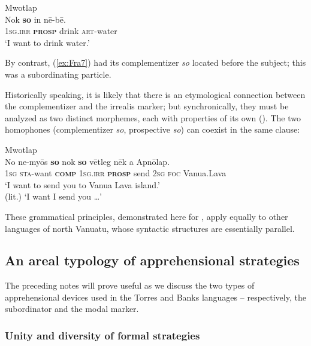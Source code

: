 \documentclass[output=paper,colorlinks,citecolor=brown]{langscibook}
\begin{document}
\ea \label{ex:Fra10} \textnormal{Mwotlap}  \\
\gll Nok \textbf{so} in nē-bē. \\
\textsc{1sg.irr} \textsc{\textbf{prosp}} drink \textsc{art}-water \\
\glt `I want to drink water.' 
\z

\noindent By contrast, (\ref{ex:Fra7}) had its complementizer \textit{so} located before the subject; this was a subordinating particle.

Historically speaking, it is likely that there is an etymological connection between the complementizer and the irrealis marker; but synchronically, they must be analyzed as two distinct morphemes, each with properties of its own (\citealt[249--257]{francois2003}). The two homophones (complementizer \textit{so}, prospective \textit{so}) can coexist in the same clause:

    \ea \label{ex:Fra11} \textnormal{Mwotlap}  \\
\gll No ne-myōs \textbf{so} nok \textbf{so} vētleg nēk a Apnōlap. \\
\textsc{1sg} \textsc{sta}-want \textsc{\textbf{comp}} \textsc{1sg.irr} \textsc{\textbf{prosp}} send \textsc{2sg} \textsc{foc} Vanua.Lava \\
\glt `I want to send you to Vanua Lava island.' \\
(lit.) `I want  I  send you {\ldots}' 
\z

These grammatical principles, demonstrated here for , apply equally to other languages of north Vanuatu, whose syntactic structures are essentially parallel. 





\subsection{An areal typology of apprehensional strategies}

The preceding notes will prove useful as we discuss the two types of apprehensional devices used in the Torres and Banks languages -- respectively, the subordinator and the modal marker.



\subsubsection{Unity and diversity of formal strategies}
\label{subsubsec:unityanddiversity}
\end{document}
